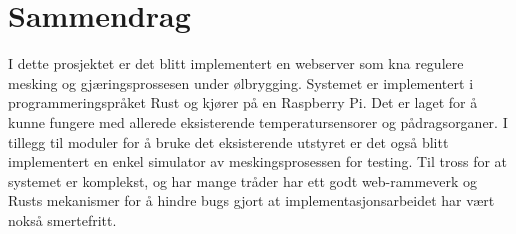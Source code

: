 \section{Sammendrag}

I dette prosjektet er det blitt implementert en webserver som kna regulere mesking og gjæringsprossesen under ølbrygging. Systemet er implementert i programmeringspråket Rust og kjører på en Raspberry Pi. Det er laget for å kunne fungere med allerede eksisterende temperatursensorer og pådragsorganer. I tillegg til moduler for å bruke det eksisterende utstyret er det også blitt implementert en enkel simulator av meskingsprosessen for testing. Til tross for at systemet er komplekst, og har mange tråder har ett godt web-rammeverk og Rusts mekanismer for å hindre bugs gjort at implementasjonsarbeidet har vært nokså smertefritt. 